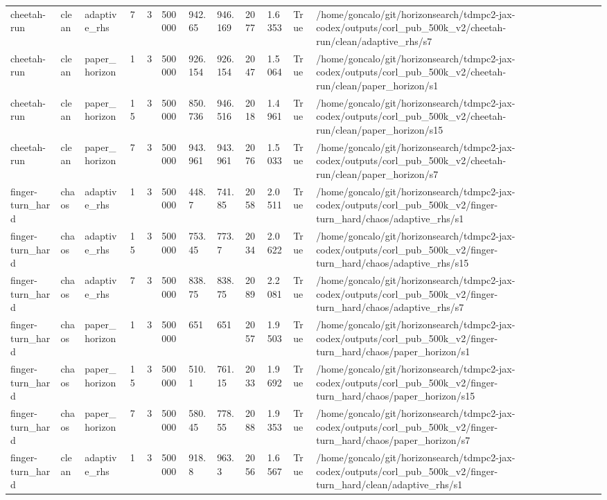 \begin{tabular}{llllllllllll}
cheetah-run & clean & adaptive\_rhs & 7 & 3 & 500000 & 942.65 & 946.169 & 2077 & 1.6353 & True & /home/goncalo/git/horizonsearch/tdmpc2-jax-codex/outputs/corl\_pub\_500k\_v2/cheetah-run/clean/adaptive\_rhs/s7 \\
cheetah-run & clean & paper\_horizon & 1 & 3 & 500000 & 926.154 & 926.154 & 2047 & 1.5064 & True & /home/goncalo/git/horizonsearch/tdmpc2-jax-codex/outputs/corl\_pub\_500k\_v2/cheetah-run/clean/paper\_horizon/s1 \\
cheetah-run & clean & paper\_horizon & 15 & 3 & 500000 & 850.736 & 946.516 & 2018 & 1.4961 & True & /home/goncalo/git/horizonsearch/tdmpc2-jax-codex/outputs/corl\_pub\_500k\_v2/cheetah-run/clean/paper\_horizon/s15 \\
cheetah-run & clean & paper\_horizon & 7 & 3 & 500000 & 943.961 & 943.961 & 2076 & 1.5033 & True & /home/goncalo/git/horizonsearch/tdmpc2-jax-codex/outputs/corl\_pub\_500k\_v2/cheetah-run/clean/paper\_horizon/s7 \\
finger-turn\_hard & chaos & adaptive\_rhs & 1 & 3 & 500000 & 448.7 & 741.85 & 2058 & 2.0511 & True & /home/goncalo/git/horizonsearch/tdmpc2-jax-codex/outputs/corl\_pub\_500k\_v2/finger-turn\_hard/chaos/adaptive\_rhs/s1 \\
finger-turn\_hard & chaos & adaptive\_rhs & 15 & 3 & 500000 & 753.45 & 773.7 & 2034 & 2.0622 & True & /home/goncalo/git/horizonsearch/tdmpc2-jax-codex/outputs/corl\_pub\_500k\_v2/finger-turn\_hard/chaos/adaptive\_rhs/s15 \\
finger-turn\_hard & chaos & adaptive\_rhs & 7 & 3 & 500000 & 838.75 & 838.75 & 2089 & 2.2081 & True & /home/goncalo/git/horizonsearch/tdmpc2-jax-codex/outputs/corl\_pub\_500k\_v2/finger-turn\_hard/chaos/adaptive\_rhs/s7 \\
finger-turn\_hard & chaos & paper\_horizon & 1 & 3 & 500000 & 651 & 651 & 2057 & 1.9503 & True & /home/goncalo/git/horizonsearch/tdmpc2-jax-codex/outputs/corl\_pub\_500k\_v2/finger-turn\_hard/chaos/paper\_horizon/s1 \\
finger-turn\_hard & chaos & paper\_horizon & 15 & 3 & 500000 & 510.1 & 761.15 & 2033 & 1.9692 & True & /home/goncalo/git/horizonsearch/tdmpc2-jax-codex/outputs/corl\_pub\_500k\_v2/finger-turn\_hard/chaos/paper\_horizon/s15 \\
finger-turn\_hard & chaos & paper\_horizon & 7 & 3 & 500000 & 580.45 & 778.55 & 2088 & 1.9353 & True & /home/goncalo/git/horizonsearch/tdmpc2-jax-codex/outputs/corl\_pub\_500k\_v2/finger-turn\_hard/chaos/paper\_horizon/s7 \\
finger-turn\_hard & clean & adaptive\_rhs & 1 & 3 & 500000 & 918.8 & 963.3 & 2056 & 1.6567 & True & /home/goncalo/git/horizonsearch/tdmpc2-jax-codex/outputs/corl\_pub\_500k\_v2/finger-turn\_hard/clean/adaptive\_rhs/s1 \\

\end{tabular}
